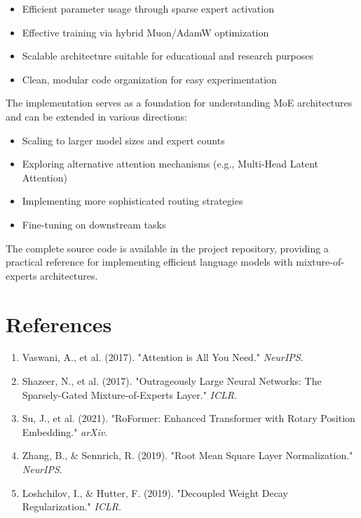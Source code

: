 \documentclass[11pt,a4paper]{article}
\begin{document}
\begin{itemize}
    \item Efficient parameter usage through sparse expert activation
    \item Effective training via hybrid Muon/AdamW optimization
    \item Scalable architecture suitable for educational and research purposes
    \item Clean, modular code organization for easy experimentation
\end{itemize}

The implementation serves as a foundation for understanding MoE architectures and can be extended in various directions:
\begin{itemize}
    \item Scaling to larger model sizes and expert counts
    \item Exploring alternative attention mechanisms (e.g., Multi-Head Latent Attention)
    \item Implementing more sophisticated routing strategies
    \item Fine-tuning on downstream tasks
\end{itemize}

The complete source code is available in the project repository, providing a practical reference for implementing efficient language models with mixture-of-experts architectures.

\section*{References}

\begin{enumerate}
    \item Vaswani, A., et al. (2017). "Attention is All You Need." \textit{NeurIPS}.
    \item Shazeer, N., et al. (2017). "Outrageously Large Neural Networks: The Sparsely-Gated Mixture-of-Experts Layer." \textit{ICLR}.
    \item Su, J., et al. (2021). "RoFormer: Enhanced Transformer with Rotary Position Embedding." \textit{arXiv}.
    \item Zhang, B., \& Sennrich, R. (2019). "Root Mean Square Layer Normalization." \textit{NeurIPS}.
    \item Loshchilov, I., & Hutter, F. (2019). "Decoupled Weight Decay Regularization." \textit{ICLR}.
\end{enumerate}
\end{document}

